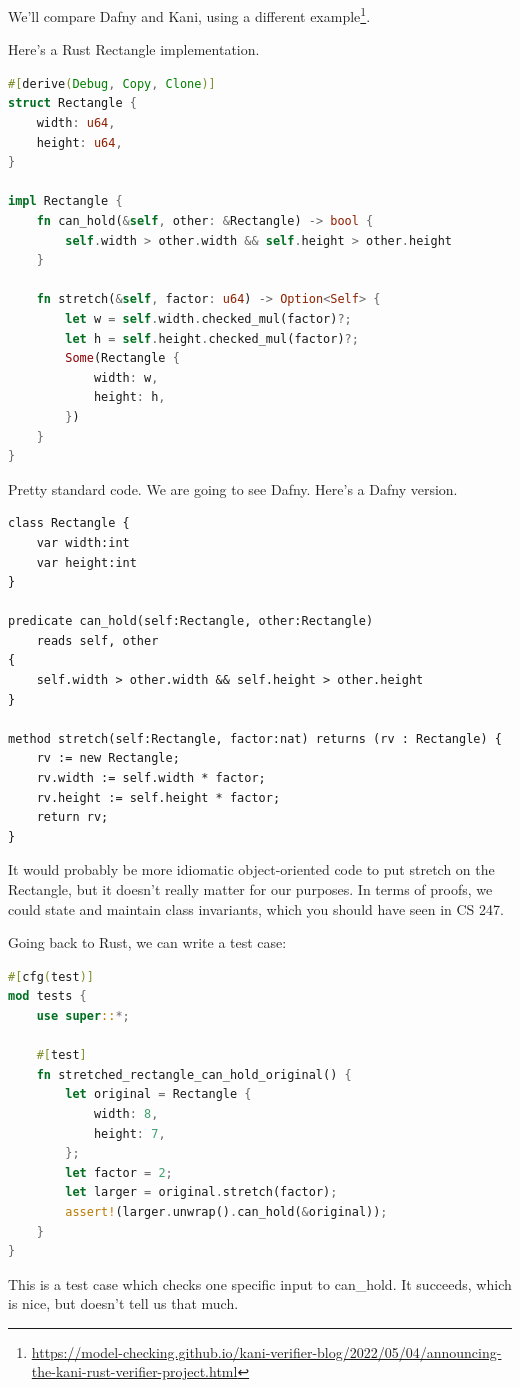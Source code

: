 \documentclass[11pt]{article}
\begin{document}

We'll compare Dafny and Kani, using a different example\footnote{\url{https://model-checking.github.io/kani-verifier-blog/2022/05/04/announcing-the-kani-rust-verifier-project.html}}.

Here's a Rust \textsf{Rectangle} implementation.

\begin{lstlisting}[language=Rust]
#[derive(Debug, Copy, Clone)]
struct Rectangle {
    width: u64,
    height: u64,
}

impl Rectangle {
    fn can_hold(&self, other: &Rectangle) -> bool {
        self.width > other.width && self.height > other.height
    }

    fn stretch(&self, factor: u64) -> Option<Self> {
        let w = self.width.checked_mul(factor)?;
        let h = self.height.checked_mul(factor)?;
        Some(Rectangle {
            width: w,
            height: h,
        })
    }
}
\end{lstlisting}

Pretty standard code. We are going to see Dafny. Here's a Dafny version.

\begin{lstlisting}[language=dafny]
class Rectangle {
    var width:int
    var height:int
}

predicate can_hold(self:Rectangle, other:Rectangle)
    reads self, other
{
    self.width > other.width && self.height > other.height
}

method stretch(self:Rectangle, factor:nat) returns (rv : Rectangle) {
    rv := new Rectangle;
    rv.width := self.width * factor;
    rv.height := self.height * factor;
    return rv;
}
\end{lstlisting}
It would probably be more idiomatic object-oriented code to put \textsf{stretch}
on the \textsf{Rectangle}, but it doesn't really matter for our purposes.
In terms of proofs, we could state and maintain class invariants, which you should
have seen in CS 247.

Going back to Rust, we can write a test case:
\begin{lstlisting}[language=Rust]
#[cfg(test)]
mod tests {
    use super::*;

    #[test]
    fn stretched_rectangle_can_hold_original() {
        let original = Rectangle {
            width: 8,
            height: 7,
        };
        let factor = 2;
        let larger = original.stretch(factor);
        assert!(larger.unwrap().can_hold(&original));
    }
}
\end{lstlisting}
This is a test case which checks one specific input to \textsf{can\_hold}.
It succeeds, which is nice, but doesn't tell us that much.
\end{document}

